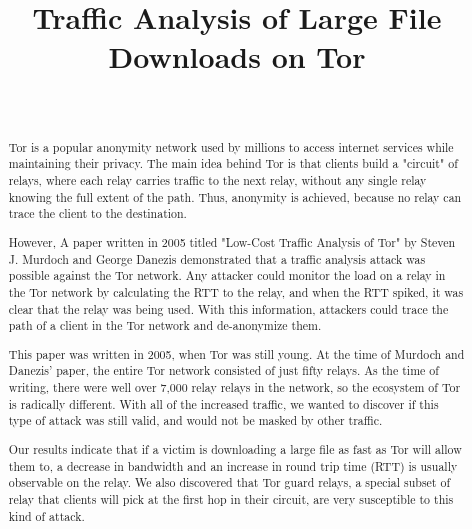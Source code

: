 \documentclass[12pt,journal]{IEEEtran}
\begin{document}
\title{Traffic Analysis of Large File Downloads on Tor}
\author{\\
        }
\maketitle

\begin{abstract}
Tor is a popular anonymity network used by millions to access internet services while maintaining their privacy. The main idea behind Tor is that clients build a "circuit" of relays, where each relay carries traffic to the next relay, without any single relay knowing the full extent of the path. Thus, anonymity is achieved, because no relay can trace the client to the destination. 

However, A paper written in 2005 titled "Low-Cost Traffic Analysis of Tor" by Steven J. Murdoch and George Danezis demonstrated that a traffic analysis attack was possible against the Tor network. Any attacker could monitor the load on a relay in the Tor network by calculating the RTT to the relay, and when the RTT spiked, it was clear that the relay was being used. With this information, attackers could trace the path of a client in the Tor network and de-anonymize them.

This paper was written in 2005, when Tor was still young. At the time of Murdoch and Danezis' paper, the entire Tor network consisted of just fifty relays. As the time of writing, there were well over 7,000 relay relays in the network, so the ecosystem of Tor is radically different. With all of the increased traffic, we wanted to discover if this type of attack was still valid, and would not be masked by other traffic.

Our results indicate that if a victim is downloading a large file as fast as Tor will allow them to, a decrease in bandwidth and an increase in round trip time (RTT) is usually observable on the relay. We also discovered that Tor guard relays, a special subset of relay that clients will pick at the first hop in their circuit, are very susceptible to this kind of attack.

\end{abstract}
\end{document}
